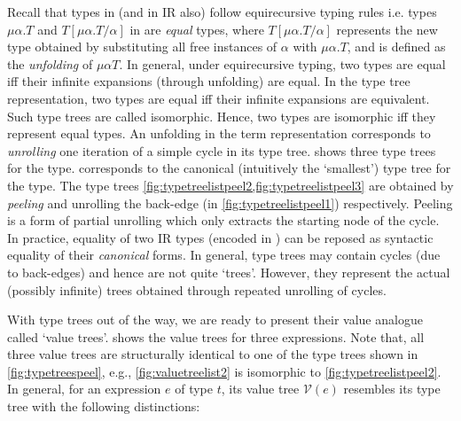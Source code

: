 

Recall that types in \SpecL{} (and in IR also) follow equirecursive typing rules i.e. types
$\mu \alpha. T$ and $T[\mu \alpha. T/\alpha]$ in \typegrammar{} are {\em equal} types,
where $T[\mu \alpha. T/\alpha]$ represents the new type obtained by substituting all free
instances of $\alpha$ with $\mu \alpha. T$, and is defined as the {\em unfolding} of $\mu \alpha T$.
In general, under equirecursive typing, two types are equal iff their infinite expansions (through unfolding) are equal.
In the type tree representation, two types are equal iff their infinite expansions are equivalent.
Such type trees are called isomorphic.
Hence, two types are isomorphic iff they represent equal types.
An unfolding in the term representation corresponds to {\em unrolling} one iteration of a simple cycle in its type tree.
 shows three type trees for the  type.
 corresponds to the canonical (intuitively the `smallest') type tree for the  type.
The type trees \cref{fig:typetreelistpeel2,fig:typetreelistpeel3} are obtained by {\em peeling} and unrolling
the back-edge  (in \cref{fig:typetreelistpeel1}) respectively.
Peeling is a form of partial unrolling which only extracts the starting node of the cycle.
In practice, equality of two IR types (encoded in \typegrammar{}) can be reposed as syntactic
equality of their {\em canonical} forms.
In general, type trees may contain cycles (due to back-edges) and hence are not quite `trees'.
However, they represent the actual (possibly infinite) trees obtained through repeated unrolling of cycles.



With type trees out of the way, we are ready to present their value analogue called `value trees'.
 shows the value trees for three  expressions.
Note that, all three value trees are structurally identical to one of the
 type trees shown in \cref{fig:typetreespeel}, e.g.,
\cref{fig:valuetreelist2} is isomorphic to \cref{fig:typetreelistpeel2}.
In general, for an expression $e$ of type $t$, its value tree $\mathcal{V}(e)$ resembles
its type tree with the following distinctions:

